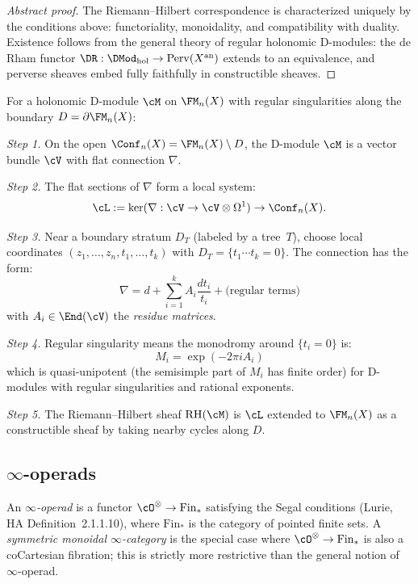 \begin{proof}[Abstract proof]
The Riemann--Hilbert correspondence is characterized uniquely by the conditions
above: functoriality, monoidality, and compatibility with duality. Existence follows
from the general theory of regular holonomic D-modules: the de Rham functor
$\DR: \DMod_{\mathrm{hol}} \to \mathrm{Perv}(X^{\mathrm{an}})$ extends to an
equivalence, and perverse sheaves embed fully faithfully in constructible sheaves.
\end{proof}

\begin{construction}
\label{constr:concrete-rh}
For a holonomic D-module $\cM$ on $\FM_n(X)$ with regular singularities along
the boundary $D = \partial \FM_n(X)$:

\emph{Step 1.} On the open $\Conf_n(X) = \FM_n(X) \setminus D$, the D-module
$\cM$ is a vector bundle $\cV$ with flat connection $\nabla$.

\emph{Step 2.} The flat sections of $\nabla$ form a local system:
\[
\cL := \ker(\nabla: \cV \to \cV \otimes \Omega^1) \to \Conf_n(X).
\]

\emph{Step 3.} Near a boundary stratum $D_T$ (labeled by
a tree~$T$), choose local coordinates
$(z_1, \ldots, z_n,\allowbreak t_1, \ldots, t_k)$
with $D_T = \{t_1 \cdots t_k = 0\}$. The connection has the
form:
\[
\nabla = d + \sum_{i=1}^k A_i \frac{dt_i}{t_i} + \text{(regular terms)}
\]
with $A_i \in \End(\cV)$ the \emph{residue matrices}.

\emph{Step 4.} Regular singularity means the monodromy around $\{t_i = 0\}$ is:
\[
M_i = \exp(-2\pi i A_i)
\]
which is quasi-unipotent (the semisimple part of $M_i$ has finite order) for D-modules with regular singularities and rational exponents.

\emph{Step 5.} The Riemann--Hilbert sheaf $\mathrm{RH}(\cM)$ is $\cL$ extended
to $\FM_n(X)$ as a constructible sheaf by taking nearby cycles along $D$.
\end{construction}


\subsection{\texorpdfstring{$\infty$-operads}{infinity-operads}}\label{sec:infty-operads}

\begin{definition}
\label{def:infty-operad}
An \emph{$\infty$-operad} is a functor $\cO^\otimes \to \mathrm{Fin}_*$
satisfying the Segal conditions (Lurie, HA Definition~2.1.1.10), where $\mathrm{Fin}_*$ is the category of
pointed finite sets. A \emph{symmetric monoidal $\infty$-category} is the special case where $\cO^\otimes \to \mathrm{Fin}_*$ is also a coCartesian fibration; this is strictly more restrictive than the general notion of $\infty$-operad.
\end{definition}

